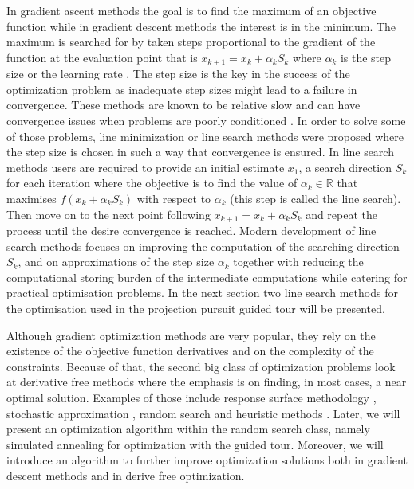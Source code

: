 In gradient ascent methods the goal is to find the maximum of an
objective function while in gradient descent methods the interest is in
the minimum. The maximum is searched for by taken steps proportional to
the gradient of the function at the evaluation point that is
\(x_{k+1} = x_k +\alpha_kS_k\) where \(\alpha_k\) is the step size or
the learning rate \citep{fletcher2013practical}. The step size is the
key in the success of the optimization problem as inadequate step sizes
might lead to a failure in convergence. These methods are known to be
relative slow and can have convergence issues when problems are poorly
conditioned \citep{trefethen1997numerical}. In order to solve some of
those problems, line minimization or line search methods were proposed
\citep{shi2004convergence} where the step size is chosen in such a way
that convergence is ensured. In line search methods users are required
to provide an initial estimate \(x_{1}\), a search direction \(S_k\) for
each iteration where the objective is to find the value of
\(\alpha_k \in \mathbb{R}\) that maximises \(f(x_k + \alpha_kS_k)\) with
respect to \(\alpha_k\) (this step is called the line search). Then move
on to the next point following \(x_{k+1} = x_k + \alpha_kS_k\) and
repeat the process until the desire convergence is reached. Modern
development of line search methods focuses on improving the computation
of the searching direction \(S_{k}\), and on approximations of the step
size \(\alpha_k\) together with reducing the computational storing
burden of the intermediate computations while catering for practical
optimisation problems. In the next section two line search methods for
the optimisation used in the projection pursuit guided tour will be
presented.

Although gradient optimization methods are very popular, they rely on
the existence of the objective function derivatives and on the
complexity of the constraints. Because of that, the second big class of
optimization problems look at derivative free methods where the emphasis
is on finding, in most cases, a near optimal solution. Examples of those
include response surface methodology \citep{box1951experimental},
stochastic approximation \citep{robbins1951stochastic}, random search
\citep{fu2015handbook} and heuristic methods
\citep{sorensen2013metaheuristics}. Later, we will present an
optimization algorithm within the random search class, namely simulated
annealing for optimization with the guided tour. Moreover, we will
introduce an algorithm to further improve optimization solutions both in
gradient descent methods and in derive free optimization.

